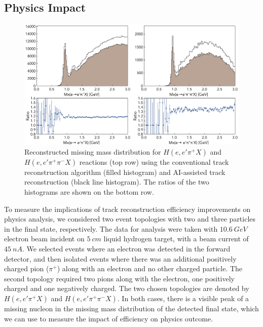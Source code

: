 \documentclass{webofc}
\begin{document}
\subsection{Physics Impact}
\label{physics-impact}

 \begin{figure}[!ht]
\begin{center}
 \includegraphics[width=4.in]{images/physics_scan.pdf}
\caption {Reconstructed missing mass distribution for $H(e,e'\pi^+X)$ and $H(e,e'\pi^+\pi^-X)$ 
reactions (top row) using the conventional track reconstruction algorithm (filled histogram) and  
AI-assisted track reconstruction (black line histogram). The ratios of the two histograms are shown 
on the bottom row. }
 \label{physics:outcome}
 \end{center}
\end{figure}

To measure the implications of track reconstruction efficiency improvements on physics analysis, 
we considered two event topologies with two and three particles in the final state, respectively. 
The data for analysis were taken with $10.6~GeV$ electron beam incident on $5~cm$ liquid 
hydrogen target, with a beam current of $45~nA$. 
We selected events where an electron was detected in the forward detector, and then isolated 
events where there was an additional positively charged pion ($\pi^+$) along with an electron 
and no other charged particle. The second topology required two pions along with the electron, 
one positively charged and one negatively charged. The two chosen topologies are denoted by 
$H(e,e'\pi^+X)$ and $H(e,e'\pi^+\pi^-X)$. In both cases, there is a visible peak of a missing nucleon
in the missing mass distribution of the detected final state, which we can use to measure the impact 
of efficiency on physics outcome. 
\end{document}
